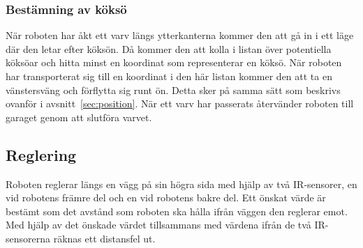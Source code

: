\documentclass{article}
\begin{document}
\subsubsection{Bestämning av köksö}
När roboten har åkt ett varv längs ytterkanterna kommer den att gå in i ett läge där den letar efter köksön. Då kommer den att kolla i listan över potentiella köksöar och hitta minst en koordinat som representerar en köksö. När roboten har transporterat sig till en koordinat i den här listan kommer den att ta en vänstersväng och förflytta sig runt ön. Detta sker på samma sätt som beskrivs ovanför i avsnitt~\ref{sec:position}. När ett varv har passerats återvänder roboten till garaget genom att slutföra varvet. 


\subsection{Reglering}
\label{sec:reglering}
Roboten reglerar längs en vägg på sin högra sida med hjälp av två IR-sensorer, en vid robotens främre del och en vid robotens bakre del. Ett önskat värde är bestämt som det avstånd som roboten ska hålla ifrån väggen den reglerar emot. Med hjälp av det önskade värdet tillsammans med värdena ifrån de två IR-sensorerna räknas ett distansfel ut. 
\end{document}
